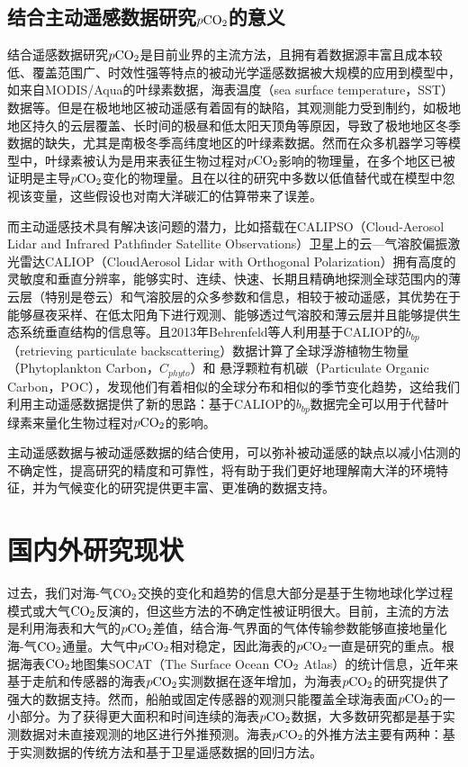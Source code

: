 \subsection{结合主动遥感数据研究\texorpdfstring{$p\rm CO_2$}{}的意义}
结合遥感数据研究$p\rm CO_2$是目前业界的主流方法，且拥有着数据源丰富且成本较低、覆盖范围广、时效性强等特点的被动光学遥感数据被大规模的应用到模型中，如来自MODIS/Aqua的叶绿素数据，海表温度（sea surface temperature，SST）数据等\cite{HBHH201803001}。但是在极地地区被动遥感有着固有的缺陷，其观测能力受到制约，如极地地区持久的云层覆盖、长时间的极昼和低太阳天顶角等原因\cite{2013Space,bbp_Annual_2017}，导致了极地地区冬季数据的缺失，尤其是南极冬季高纬度地区的叶绿素数据。然而在众多机器学习等模型中，叶绿素被认为是用来表征生物过程对$p\rm CO_2$影响的物理量，在多个地区已被证明是主导$p\rm CO_2$变化的物理量\cite{tu2021increase,brown2019enhanced}。且在以往的研究中多数以低值替代\cite{CSIR_ML6,gregor2017empirical,LSCE_FFNN}或在模型中忽视该变量\cite{JMA_MLR,MPI_SOMFFN}，这些假设也对南大洋碳汇的估算带来了误差。

而主动遥感技术具有解决该问题的潜力，比如搭载在CALIPSO（Cloud-Aerosol Lidar and Infrared Pathfinder Satellite Observations）卫星上的云—气溶胶偏振激光雷达CALIOP（CloudAerosol Lidar with Orthogonal Polarization）拥有高度的灵敏度和垂直分辨率，能够实时、连续、快速、长期且精确地探测全球范围内的薄云层（特别是卷云）和气溶胶层的众多参数和信息，相较于被动遥感，其优势在于能够昼夜采样、在低太阳角下进行观测、能够透过气溶胶和薄云层并且能够提供生态系统垂直结构的信息等\cite{CALIPSO_2009}。且2013年Behrenfeld等人\cite{2013Space}利用基于CALIOP的$b_{bp}$（retrieving particulate backscattering）数据计算了全球浮游植物生物量（Phytoplankton Carbon，$C_{phyto}$）和 悬浮颗粒有机碳（Particulate Organic Carbon，POC），发现他们有着相似的全球分布和相似的季节变化趋势，这给我们利用主动遥感数据提供了新的思路：基于CALIOP的$b_{bp}$数据完全可以用于代替叶绿素来量化生物过程对$p\rm CO_2$的影响。

主动遥感数据与被动遥感数据的结合使用，可以弥补被动遥感的缺点以减小估测的不确定性，提高研究的精度和可靠性，将有助于我们更好地理解南大洋的环境特征，并为气候变化的研究提供更丰富、更准确的数据支持。


\section{国内外研究现状}
过去，我们对海-气$\rm CO_2$交换的变化和趋势的信息大部分是基于生物地球化学过程模式或大气$\rm CO_2$反演的，但这些方法的不确定性被证明很大\cite{Wanninkhof_2013}。目前，主流的方法是利用海表和大气的$p\rm CO_2$差值，结合海-气界面的气体传输参数能够直接地量化海-气$\rm CO_2$通量。大气中$p\rm CO_2$相对稳定，因此海表的$p\rm CO_2$一直是研究的重点。根据海表$\rm CO_2$地图集SOCAT\cite{socat2016}（The Surface Ocean $\rm CO_2$ Atlas）的统计信息，近年来基于走航和传感器的海表$p\rm CO_2$实测数据在逐年增加，为海表$p\rm CO_2$的研究提供了强大的数据支持。然而，船舶或固定传感器的观测只能覆盖全球海表面$p\rm CO_2$的一小部分。为了获得更大面积和时间连续的海表$p\rm CO_2$数据，大多数研究都是基于实测数据对未直接观测的地区进行外推预测。海表$p\rm CO_2$的外推方法主要有两种：基于实测数据的传统方法和基于卫星遥感数据的回归方法。

